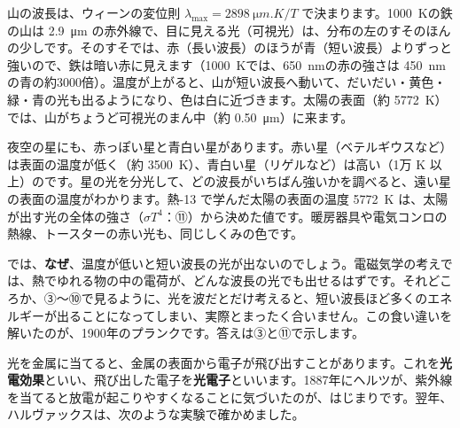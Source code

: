 \noindent 山の波長は、ウィーンの変位則 $\lambda_{\max}=\qty{2898}{\micro m.K}/T$ で決まります。\qty{1000}{K}の鉄の山は \qty{2.9}{\micro m} の赤外線で、目に見える光（可視光）は、分布の左のすそのほんの少しです。そのすそでは、赤（長い波長）のほうが青（短い波長）よりずっと強いので、鉄は暗い赤に見えます（\qty{1000}{K}では、\qty{650}{nm}の赤の強さは \qty{450}{nm}の青の約3000倍）。温度が上がると、山が短い波長へ動いて、だいだい・黄色・緑・青の光も出るようになり、色は白に近づきます。太陽の表面（約 \qty{5772}{K}）では、山がちょうど可視光のまん中（約 \qty{0.50}{\micro m}）に来ます。

\begin{phmijika}
夜空の星にも、赤っぽい星と青白い星があります。赤い星（ベテルギウスなど）は表面の温度が低く（約 \qty{3500}{K}）、青白い星（リゲルなど）は高い（1万 K 以上）のです。星の光を分光して、どの波長がいちばん強いかを調べると、遠い星の表面の温度がわかります。熱-13 で学んだ太陽の表面の温度 \qty{5772}{K} は、太陽が出す光の全体の強さ（$\sigma T^4$：⑪）から決めた値です。暖房器具や電気コンロの熱線、トースターの赤い光も、同じしくみの色です。
\end{phmijika}

\noindent では、\textbf{なぜ}、温度が低いと短い波長の光が出ないのでしょう。電磁気学の考えでは、熱でゆれる物の中の電荷が、どんな波長の光でも出せるはずです。それどころか、③〜⑩で見るように、光を波だとだけ考えると、短い波長ほど多くのエネルギーが出ることになってしまい、実際とまったく合いません。この食い違いを解いたのが、1900年のプランクです。答えは③と⑪で示します。

\label{ph:原-2:sec2}
光を金属に当てると、金属の表面から電子が飛び出すことがあります。これを\textbf{光電効果}といい、飛び出した電子を\textbf{光電子}といいます。1887年にヘルツが、紫外線を当てると放電が起こりやすくなることに気づいたのが、はじまりです。翌年、ハルヴァックスは、次のような実験で確かめました。

